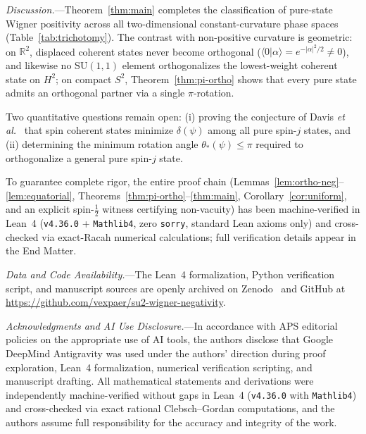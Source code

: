 \documentclass[aps,prl,reprint,amsmath,amssymb,nofootinbib,floatfix]{revtex4-2}
\newcommand{\braket}[2]{\langle #1 \vert #2 \rangle}
\begin{document}
\emph{Discussion.}---Theorem~\ref{thm:main} completes the classification of pure-state Wigner positivity across all two-dimensional constant-curvature phase spaces (Table~\ref{tab:trichotomy}). The contrast with non-positive curvature is geometric: on $\mathbb{R}^2$, displaced coherent states never become orthogonal ($\braket{0}{\alpha} = e^{-|\alpha|^2/2} \neq 0$), and likewise no $\mathrm{SU}(1,1)$ element orthogonalizes the lowest-weight coherent state on $H^2$; on compact $S^2$, Theorem~\ref{thm:pi-ortho} shows that every pure state admits an orthogonal partner via a single $\pi$-rotation.

Two quantitative questions remain open: (i) proving the conjecture of Davis \textit{et al.}~\cite{Davis2021,Davis2023} that spin coherent states minimize $\delta(\psi)$ among all pure spin-$j$ states, and (ii) determining the minimum rotation angle $\theta_*(\psi) \le \pi$ required to orthogonalize a general pure spin-$j$ state.

To guarantee complete rigor, the entire proof chain (Lemmas~\ref{lem:ortho-neg}--\ref{lem:equatorial}, Theorems~\ref{thm:pi-ortho}--\ref{thm:main}, Corollary~\ref{cor:uniform}, and an explicit spin-$\frac{1}{2}$ witness certifying non-vacuity) has been machine-verified in Lean~4 (\texttt{v4.36.0} + \texttt{Mathlib4}, zero \texttt{sorry}, standard Lean axioms only) and cross-checked via exact-Racah numerical calculations; full verification details appear in the End Matter.

\emph{Data and Code Availability.}---The Lean~4 formalization, Python verification script, and manuscript sources are openly archived on Zenodo~\cite{Wang2026Zenodo} and GitHub at \url{https://github.com/vexpaer/su2-wigner-negativity}.

\emph{Acknowledgments and AI Use Disclosure.}---In accordance with APS editorial policies on the appropriate use of AI tools, the authors disclose that Google DeepMind Antigravity was used under the authors' direction during proof exploration, Lean~4 formalization, numerical verification scripting, and manuscript drafting. All mathematical statements and derivations were independently machine-verified without gaps in Lean~4 (\texttt{v4.36.0} with \texttt{Mathlib4}) and cross-checked via exact rational Clebsch--Gordan computations, and the authors assume full responsibility for the accuracy and integrity of the work.
\end{document}
